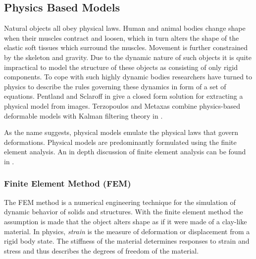 \documentclass[11pt,a4paper]{report}
\begin{document}
\subsection{Physics Based Models}
Natural objects all obey physical laws. Human and animal bodies change shape
when their muscles contract and loosen, which in turn alters the shape of the
elastic soft tissues which surround the muscles. Movement is further constrained
by the skeleton and gravity. Due to the dynamic nature of such objects it is quite impractical to
model the structure of these objects as consisting of only rigid components. To cope with
such highly dynamic bodies researchers have turned to physics to describe the
rules governing these dynamics in form of a set of equations. Pentland and
Sclaroff in  \cite{FEM1pen} give a closed form solution for extracting a
physical model from images. Terzopoulos and Metaxas combine physics-based
deformable models with Kalman filtering theory in \cite{FEM1ter}.  

As the name suggests, physical models emulate the physical laws that govern
deformations. Physical models are predominantly formulated using the finite
element analysis. An in depth discussion of finite element
analysis can be found in \cite{FEMbook}.

\subsubsection{Finite Element Method (FEM)}
The FEM method is a numerical engineering technique for the simulation of dynamic
behavior of solids and structures. With the finite element method the assumption is made that
the object alters shape as if it were made of a clay-like material. In physics,
\textit{strain} is the measure of deformation or displacement from a rigid body state. The stiffness
of the material determines responses to strain and stress and thus describes the
degrees of freedom of the material.
\end{document}
